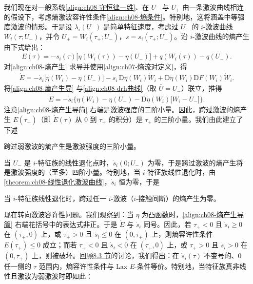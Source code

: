 \documentclass[../../main.tex]{subfiles}
\begin{document}
我们现在对一般系统\eqref{align:ch08-守恒律一维}、在 $U_-$ 与 $U_+$ 由一条激波曲线相连的假设下，考虑熵激波容许性条件\eqref{align:ch08-熵条件}。特别地，这将涵盖中等强度激波的情形。于是设 $\lambda_i(U_-)$ 是简单特征速度，考虑过 $U_-$ 的 $i$-激波曲线 $W_i(\tau;U_-)$，并令 $U_+=W_i(\tau_+;U_-)$，$s=s_i(\tau_+;U_-)$。沿 $i$-激波曲线的熵产生由下式给出：
\begin{align}
E(\tau)=-s_i(\tau)\big[\eta(W_i(\tau))-\eta(U_-)\big]+q(W_i(\tau))-q(U_-).
\label{align:ch08-熵产生}
\end{align}
对\eqref{align:ch08-熵产生} 求导并使用\eqref{align:ch07-熵流对定义}，得
\begin{align}
\dot E=-\dot s_i\big[\eta(W_i)-\eta(U_-)\big]-s_i\,\mathrm{D}\eta(W_i)\dot W_i+\mathrm{D}\eta(W_i)\mathrm{D}F(W_i)\dot W_i.
\label{align:ch08-熵产生导}
\end{align}
将\eqref{align:ch08-熵产生导} 与\eqref{align:ch08-drh曲线}（取 $\bar U=U_-$）联立，推得
\begin{align}
\dot E=-\dot s_i\big\{\eta(W_i)-\eta(U_-)-\mathrm{D}\eta(W_i)\big[W_i-U_-\big]\big\}.
\label{align:ch08-熵产生导简}
\end{align}
注意\eqref{align:ch08-熵产生导简} 右端是激波强度的二阶小量。因此，跨过激波的熵产生 $E(\tau_+)$（即 $\dot E(\tau)$ 从 $0$ 到 $\tau_+$ 的积分）是 $\tau_+$ 的三阶小量。我们由此建立了下述

\begin{theorem}[弱激波熵产生的阶]\label{theorem:ch08-弱激波熵产生}
跨过弱激波的熵产生是激波强度的三阶小量。
\end{theorem}

当 $U_-$ 是 $i$-特征族的线性退化点时，$\dot s_i(0;U_-)$ 为零，于是跨过激波的熵产生将是激波强度的（至多）四阶小量。特别地，当 $i$-特征族线性退化时，由\cref{theorem:ch08-线性退化激波曲线}，$\dot s_i$ 恒为零，于是

\begin{theorem}[接触间断的熵产生为零]\label{theorem:ch08-接触熵零}
当 $i$-特征族线性退化时，跨过任一 $i$-激波（$i$-接触间断）的熵产生为零。
\end{theorem}

现在转向激波容许性问题。我们观察到：当 $\eta$ 为凸函数时，\eqref{align:ch08-熵产生导简} 右端花括号中的表达式非正。于是 $\dot E$ 与 $\dot s_i$ 同号。因此，若 $\tau_+<0$ 且 $\dot s_i\geqslant0$ 在 $(\tau_+,0)$ 上，或 $\tau_+>0$ 且 $\dot s_i\leqslant0$ 在 $(0,\tau_+)$ 上，则熵容许性条件 $E(\tau_+)\leqslant0$ 成立；而若 $\tau_+<0$ 且 $\dot s_i<0$ 在 $(\tau_+,0)$ 上，或 $\tau_+>0$ 且 $\dot s_i>0$ 在 $(0,\tau_+)$ 上，则被破坏。回顾\hyperref[section:ch08-lax容许性准则]{8.3 节}的讨论，我们得出：在 $\dot s_i(\tau)$ 不变号的、$0$ 任一侧的 $\tau$ 范围内，熵容许性条件与 Lax $E$-条件等价。特别地，当特征族真非线性且激波为弱激波时即如此：
\end{document}
